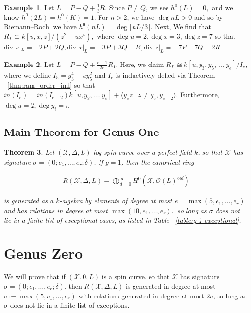 \documentclass{amsart}
\theoremstyle{plain}
\newtheorem{thm}{Theorem}[section]
\theoremstyle{definition}
\newtheorem{example}[thm]{Example}
\theoremstyle{remark}
\numberwithin{equation}{section}
\newcommand\ssec{\subsection}
\newcommand \sx{\mathscr X}
\newcommand\sco{{\mathscr O}}
\newcommand \di{\text{div }}
\newcommand \halfcan{L}
\begin{document}
\begin{example}
\label{eg:exceptional-1-3}
Let $L = P - Q + \frac{1}{3}R$. Since $P \neq Q$, we see $h^0(L) = 0,$ and we know $h^0(2L) = h^0(K) = 1$. For $n > 2$, we have $\deg nL > 0$ and so by Riemann--Roch, we have $h^0(nL) = \deg \lfloor nL/3 \rfloor.$ Next, 
We find that $R_L \cong k[u,x,z]/(z^2 - ux^4),$ where $\deg u = 2, \deg x = 3, \deg z = 7$ so that $\di u|_L = -2P + 2Q, \di x|_L = -3P + 3Q - R, \di z|_L = -7P + 7Q - 2R.$
\end{example}


\begin{example}
\label{eg:exception-1-e}
Let $L = P - Q + \frac{e-1}{2e}R_1.$ Here, we claim $R_L \cong k[u,y_3, y_5, \ldots, y_e]/I_e,$ where we define $I_5 = y_3^4 - uy_5^2$ and $I_e$ is inductively defied via Theorem ~\ref{thm:ram_order_ind} so that $in(I_e) = in(I_{e-2})k[u, y_3,\ldots, y_e] + \langle y_e z \mid z \neq y_e, y_{e-2} \rangle.$
Furthermore, $\deg u = 2, \deg y_i = i$.
\end{example}
\fi


\ssec{Main Theorem for Genus One}
\label{ssec:main_g_1}

\begin{thm}
\label{thm:g_1_generators_relations}
Let $(\sx, \Delta, \halfcan)$ log spin curve over a perfect field $k$,
so that $\sx$ has signature $\sigma = (0; e_1, \ldots, e_r; \delta)$.
If $g = 1$, then the canonical ring

\begin{align*}
	R(\sx, \Delta, \halfcan) = \bigoplus_{d = 0}^\infty H^0(\sx, \sco(L)^{\otimes d})
\end{align*}

\noindent
is generated as a $k$-algebra by elements of degree at most $e =
\max(5, e_1, \ldots, e_r)$ and has relations in degree at most $\max
(10, e_1, \ldots, e_r),$ so long as $\sigma$ does not lie in a
finite list of exceptional cases, as listed in Table
~\ref{table:g-1-exceptional}.
\end{thm}



\section{Genus Zero}
\label{sec:g_0}
We will prove that if $(\sx , 0, \halfcan)$ is a spin curve, so
that $\sx$ has signature $\sigma = (0; e_1, \ldots , e_r; \delta)$,
then $R(\sx , \Delta, L)$ is generated in degree at most $e := \max(
5, e_1, \ldots, e_r)$ with relations generated in degree at most $2e
$, so long as $\sigma$ does not lie in a finite list of exceptions.
\end{document}
